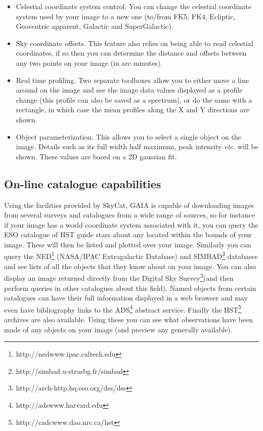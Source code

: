 \documentclass[twoside,11pt]{article}
\newcommand{\htmladdnormallinkfoot}[2]{#1\footnote{#2}}
\newcommand{\htmladdnormallink}[2]{#1}
\newcommand{\xlabel}[1]{}
\renewcommand{\_}{\texttt{\symbol{95}}}
\begin{document}
\begin{itemize}
\item Celestial coordinate system control. You can change the celestial
  coordinate system used by your image to a new one (to/from FK5,
  FK4, Ecliptic, Geocentric apparent, Galactic and SuperGalactic).

\item Sky coordinate offsets. This feature also relies on being
  able to read celestial coordinates, if so then you can
  determine the distance and offsets between any two points on
  your image (in arc minutes).

\item Real time profiling. Two separate toolboxes allow you to either
  move a line around on the image and see the image data values
  displayed as a profile change (this profile can also be saved as a
  spectrum), or do the same with a rectangle, in which case the mean
  profiles along the X and Y directions are shown.

\item Object parameterization. This allows you to select a single
  object on the image. Details such as its full width half
  maximum, peak intensity {\em etc.} will be shown. These values are
  based on a 2D gaussian fit.
\end{itemize}

\subsection{\xlabel{online_catalogue_capabilities}On-line catalogue capabilities}

Using the facilities provided by
\htmladdnormallink{SkyCat}{http://archive.eso.org/skycat}, GAIA is
capable of downloading images from several surveys and catalogues from a
wide range of sources, so for instance if your image has a world
coordinate system associated with it, you can query the ESO catalogue of
HST guide stars about any located within the bounds of your image. These
will then be listed and plotted over your image.  Similarly you can
query the
\htmladdnormallinkfoot{NED}{http://nedwww.ipac.caltech.edu}
(NASA/IPAC Extragalactic Database) and
\htmladdnormallinkfoot{SIMBAD}{http://simbad.u-strasbg.fr/simbad}
databases and see lists of all the objects that they know about on your
image. You can also display an image returned directly from the
\htmladdnormallinkfoot{Digital Sky Survey}
{http://arch-http.hq.eso.org/dss/dss}(and then perform queries in other
catalogues about this field). Named objects from certain catalogues can
have their full information displayed in a web browser and may even have
bibliography links to the
\htmladdnormallinkfoot{ADS}{http://adswww.harvard.edu} abstract
service.  Finally the
\htmladdnormallinkfoot{HST}{http://cadcwww.dao.nrc.ca/hst} archives
are also available. Using these you can see what observations have
been made of any objects on your image (and preview any generally
available).
\end{document}
